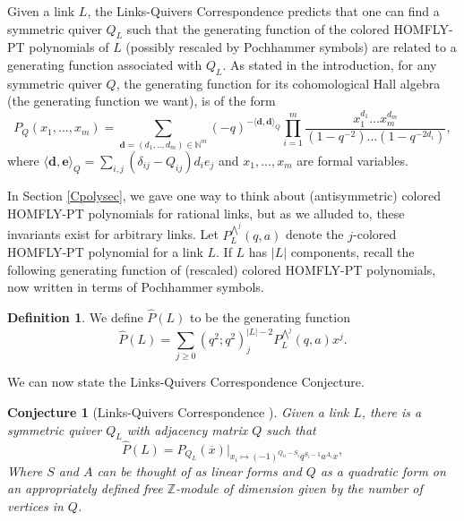 \documentclass[11pt]{amsart}
\theoremstyle{plain}
\newtheorem{conjectureN}[theoremN]{Conjecture}
\theoremstyle{definition}
\newtheorem{definitionN}[theoremN]{Definition}
\theoremstyle{remark}
\begin{document}
Given a link $L$, the Links-Quivers Correspondence predicts that one can find a symmetric quiver $Q_L$ such that the generating function of the colored HOMFLY-PT polynomials of $L$ (possibly rescaled by Pochhammer symbols) are related to a generating function associated with $Q_L$. As stated in the introduction, for any symmetric quiver $Q$, the generating function for its cohomological Hall algebra (the generating function we want), is of the form
\begin{equation}
    P_Q(x_1,...,x_m) = \sum_{\textbf{d}=(d_1,..,d_m)\in\mathbb{N}^m} (-q)^{-\langle \textbf{d},\textbf{d}\rangle_Q}\prod_{i=1}^m \frac{x_1^{d_1}...x_m^{d_m}}{(1-q^{-2})...(1-q^{-2d_i})},
\end{equation}
where $\langle \textbf{d},\textbf{e}\rangle_Q = \sum_{i,j}(\delta_{ij}- Q_{ij})d_ie_j$ and $x_1,...,x_m$ are formal variables.

In Section \ref{Cpolysec}, we gave one way to think about (antisymmetric) colored HOMFLY-PT polynomials for rational links, but as we alluded to, these invariants exist for arbitrary links. Let $P_L^{\bigwedge^j}(q,a)$ denote the $j$-colored HOMFLY-PT polynomial for a link $L$. If $L$ has $|L|$ components, recall the following generating function of (rescaled) colored HOMFLY-PT polynomials, now written in terms of Pochhammer symbols.

\begin{definitionN}
   We define $\widehat{P}(L)$ to be the generating function
    \begin{equation}
        \widehat{P}(L)=\sum_{j\geq0}(q^2;q^2)_j^{|L|-2}P_L^{\bigwedge^j}(q,a)x^j.
    \end{equation} 
\end{definitionN}

We can now state the Links-Quivers Correspondence Conjecture.

\begin{conjectureN}[Links-Quivers Correspondence \cite{K19}]
    Given a link $L$, there is a symmetric quiver $Q_L$ with adjacency matrix $Q$ such that
    \begin{equation}
    \widehat{P}(L)=P_{Q_L}(\overline{x})|_{x_i\mapsto (-1)^{Q_{ii}-S_i}q^{S_i-1}a^{A_i}x},
   \end{equation}
   Where $S$ and $A$ can be thought of as linear forms and $Q$ as a quadratic form on an appropriately defined free $\mathbb{Z}$-module of dimension given by the number of vertices in $Q$.
\end{conjectureN}
\end{document}
